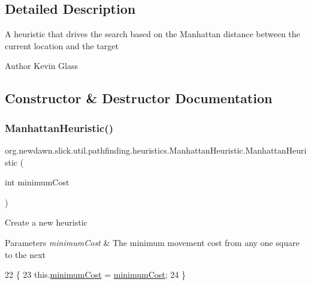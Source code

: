 \subsection{Detailed Description}
A heuristic that drives the search based on the Manhattan distance between the current location and the target

\begin{DoxyAuthor}{Author}
Kevin Glass 
\end{DoxyAuthor}


\subsection{Constructor \& Destructor Documentation}
\mbox{\label{classorg_1_1newdawn_1_1slick_1_1util_1_1pathfinding_1_1heuristics_1_1_manhattan_heuristic_a84454e3742e506767479223dbae1a36f}} 
\subsubsection{\texorpdfstring{Manhattan\+Heuristic()}{ManhattanHeuristic()}}
{\footnotesize\ttfamily org.\+newdawn.\+slick.\+util.\+pathfinding.\+heuristics.\+Manhattan\+Heuristic.\+Manhattan\+Heuristic (\begin{DoxyParamCaption}\item[{int}]{minimum\+Cost }\end{DoxyParamCaption})\hspace{0.3cm}{\ttfamily [inline]}}

Create a new heuristic


\begin{DoxyParams}{Parameters}
{\em minimum\+Cost} & The minimum movement cost from any one square to the next \\
\hline
\end{DoxyParams}

\begin{DoxyCode}
22                                                \{
23         this.\mbox{\hyperlink{classorg_1_1newdawn_1_1slick_1_1util_1_1pathfinding_1_1heuristics_1_1_manhattan_heuristic_aa9c2d604c30d1ab8c31672ea5daeef40}{minimumCost}} = \mbox{\hyperlink{classorg_1_1newdawn_1_1slick_1_1util_1_1pathfinding_1_1heuristics_1_1_manhattan_heuristic_aa9c2d604c30d1ab8c31672ea5daeef40}{minimumCost}};
24     \}
\end{DoxyCode}


